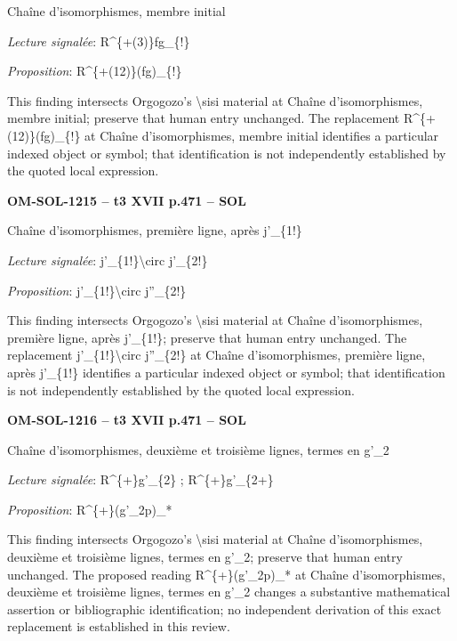 Chaîne d'isomorphismes, membre initial\par
\emph{Lecture signalée}: R\textasciicircum{}\{+(3)\}fg\_\{!\}\par
\emph{Proposition}: R\textasciicircum{}\{+(12)\}(fg)\_\{!\}\par
This finding intersects Orgogozo's \textbackslash{}sisi material at Chaîne d'isomorphismes, membre initial; preserve that human entry unchanged. The replacement R\textasciicircum{}\{+(12)\}(fg)\_\{!\} at Chaîne d'isomorphismes, membre initial identifies a particular indexed object or symbol; that identification is not independently established by the quoted local expression.\par
\par\noindent\textbf{OM-SOL-1215 -- t3 XVII p.471 -- SOL}\par
Chaîne d'isomorphismes, première ligne, après j'\_\{1!\}\par
\emph{Lecture signalée}: j'\_\{1!\}\textbackslash{}circ j'\_\{2!\}\par
\emph{Proposition}: j'\_\{1!\}\textbackslash{}circ j''\_\{2!\}\par
This finding intersects Orgogozo's \textbackslash{}sisi material at Chaîne d'isomorphismes, première ligne, après j'\_\{1!\}; preserve that human entry unchanged. The replacement j'\_\{1!\}\textbackslash{}circ j''\_\{2!\} at Chaîne d'isomorphismes, première ligne, après j'\_\{1!\} identifies a particular indexed object or symbol; that identification is not independently established by the quoted local expression.\par
\par\noindent\textbf{OM-SOL-1216 -- t3 XVII p.471 -- SOL}\par
Chaîne d'isomorphismes, deuxième et troisième lignes, termes en g'\_2\par
\emph{Lecture signalée}: R\textasciicircum{}\{+\}g'\_\{2\} ; R\textasciicircum{}\{+\}g'\_\{2+\}\par
\emph{Proposition}: R\textasciicircum{}\{+\}(g'\_2p)\_*\par
This finding intersects Orgogozo's \textbackslash{}sisi material at Chaîne d'isomorphismes, deuxième et troisième lignes, termes en g'\_2; preserve that human entry unchanged. The proposed reading R\textasciicircum{}\{+\}(g'\_2p)\_* at Chaîne d'isomorphismes, deuxième et troisième lignes, termes en g'\_2 changes a substantive mathematical assertion or bibliographic identification; no independent derivation of this exact replacement is established in this review.\par
